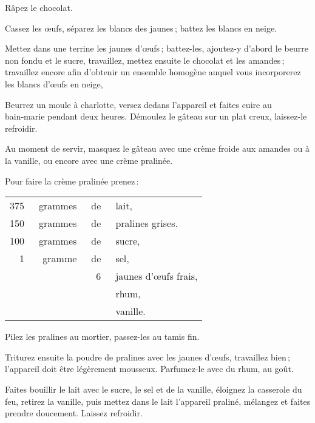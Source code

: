 Râpez le chocolat.

Cassez les œufs, séparez les blancs des jaunes ; battez les blancs en neige.

Mettez dans une terrine les jaunes d'œufs ; battez-les, ajoutez-y d'abord le
beurre non fondu et le sucre, travaillez, mettez ensuite le chocolat et les
amandes ; travaillez encore afin d'obtenir un ensemble homogène auquel vous
incorporerez les blancs d'œufs en neige,

Beurrez un moule à charlotte, versez dedans l'appareil et faites cuire au
bain‑marie pendant deux heures. Démoulez le gâteau sur un plat creux,
laissez-le refroidir.

Au moment de servir, masquez le gâteau avec une crème froide aux amandes ou
à la vanille, ou encore avec une crème pralinée.

\sk

Pour faire la crème pralinée prenez :

\footnotesize
\begin{longtable}{rrrp{16em}}
    375 & grammes & de & lait,                                                                            \\
    150 & grammes & de & pralines grises.                                                                 \\
    100 & grammes & de & sucre,                                                                           \\
      1 & gramme  & de & sel,                                                                             \\
        &         &  6 & jaunes d'œufs frais,                                                             \\
        &         &    & rhum,                                                                            \\
        &         &    & vanille.                                                                         \\
\end{longtable}
\normalsize

Pilez les pralines au mortier, passez-les au tamis fin.

Triturez ensuite la poudre de pralines avec les jaunes d'œufs, travaillez
bien ; l'appareil doit être légèrement mousseux. Parfumez-le avec du rhum,
au goût.

Faites bouillir le lait avec le sucre, le sel et de la vanille, éloignez la casserole
du feu, retirez la vanille, puis mettez dans le lait l'appareil praliné, mélangez et
faites prendre doucement. Laissez refroidir.

